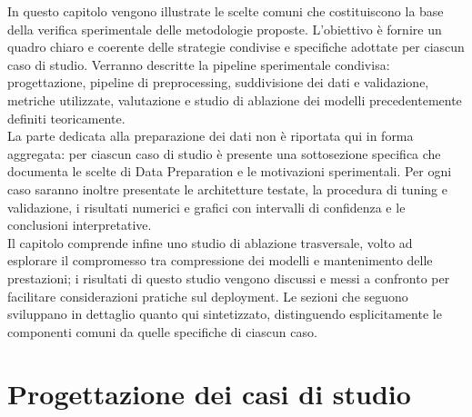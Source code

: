 \documentclass[a4paper,12pt]{report}
\begin{document}
	In questo capitolo vengono illustrate le scelte comuni che costituiscono la base della verifica sperimentale delle metodologie proposte. L'obiettivo è fornire un quadro chiaro e coerente delle strategie condivise e specifiche adottate per ciascun caso di studio. Verranno descritte la pipeline sperimentale condivisa: progettazione, pipeline di preprocessing, suddivisione dei dati e validazione, metriche utilizzate, valutazione e studio di ablazione dei modelli precedentemente definiti teoricamente. \\
	La parte dedicata alla preparazione dei dati non è riportata qui in forma aggregata: per ciascun caso di studio è presente una sottosezione specifica che documenta le scelte di Data Preparation e le motivazioni sperimentali. Per ogni caso saranno inoltre presentate le architetture testate, la procedura di tuning e validazione, i risultati numerici e grafici con intervalli di confidenza e le conclusioni interpretative. \\
	Il capitolo comprende infine uno studio di ablazione trasversale, volto ad esplorare il compromesso tra compressione dei modelli e mantenimento delle prestazioni; i risultati di questo studio vengono discussi e messi a confronto per facilitare considerazioni pratiche sul deployment. Le sezioni che seguono sviluppano in dettaglio quanto qui sintetizzato, distinguendo esplicitamente le componenti comuni da quelle specifiche di ciascun caso.
	
	\section{Progettazione dei casi di studio}
	
\end{document}
